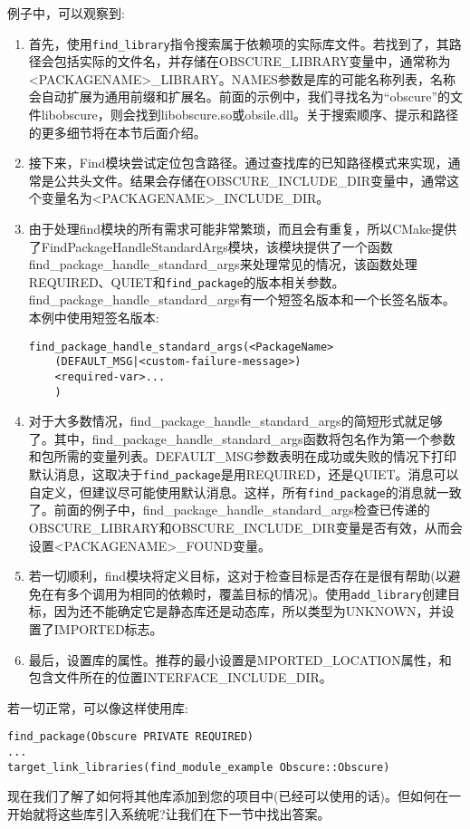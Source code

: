 例子中，可以观察到:

\begin{enumerate}
\item 
首先，使用\texttt{find\_library}指令搜索属于依赖项的实际库文件。若找到了，其路径会包括实际的文件名，并存储在OBSCURE\_LIBRARY变量中，通常称为<PACKAGENAME>\_LIBRARY。NAMES参数是库的可能名称列表，名称会自动扩展为通用前缀和扩展名。前面的示例中，我们寻找名为“obscure”的文件libobscure，则会找到libobscure.so或obsile.dll。关于搜索顺序、提示和路径的更多细节将在本节后面介绍。

\item 
接下来，Find模块尝试定位包含路径。通过查找库的已知路径模式来实现，通常是公共头文件。结果会存储在OBSCURE\_INCLUDE\_DIR变量中，通常这个变量名为<PACKAGENAME>\_INCLUDE\_DIR。

\item 
由于处理find模块的所有需求可能非常繁琐，而且会有重复，所以CMake提供了FindPackageHandleStandardArgs模块，该模块提供了一个函数find\_package\_handle\_standard\_args来处理常见的情况，该函数处理REQUIRED、QUIET和\texttt{find\_package}的版本相关参数。find\_package\_handle\_standard\_args有一个短签名版本和一个长签名版本。本例中使用短签名版本:

\begin{lstlisting}[style=styleCMake]
find_package_handle_standard_args(<PackageName>
	(DEFAULT_MSG|<custom-failure-message>)
	<required-var>...
	)
\end{lstlisting}

\item 
对于大多数情况，find\_package\_handle\_standard\_args的简短形式就足够了。其中，find\_package\_handle\_standard\_args函数将包名作为第一个参数和包所需的变量列表。DEFAULT\_MSG参数表明在成功或失败的情况下打印默认消息，这取决于\texttt{find\_package}是用REQUIRED，还是QUIET。消息可以自定义，但建议尽可能使用默认消息。这样，所有\texttt{find\_package}的消息就一致了。前面的例子中，find\_package\_handle\_standard\_args检查已传递的OBSCURE\_LIBRARY和OBSCURE\_INCLUDE\_DIR变量是否有效，从而会设置<PACKAGENAME>\_FOUND变量。

\item 
若一切顺利，find模块将定义目标，这对于检查目标是否存在是很有帮助(以避免在有多个调用为相同的依赖时，覆盖目标的情况)。使用\texttt{add\_library}创建目标，因为还不能确定它是静态库还是动态库，所以类型为UNKNOWN，并设置了IMPORTED标志。

\item 
最后，设置库的属性。推荐的最小设置是MPORTED\_LOCATION属性，和包含文件所在的位置INTERFACE\_INCLUDE\_DIR。
\end{enumerate}

若一切正常，可以像这样使用库:

\begin{lstlisting}[style=styleCMake]
find_package(Obscure PRIVATE REQUIRED)
...
target_link_libraries(find_module_example Obscure::Obscure)
\end{lstlisting}

现在我们了解了如何将其他库添加到您的项目中(已经可以使用的话)。但如何在一开始就将这些库引入系统呢?让我们在下一节中找出答案。

